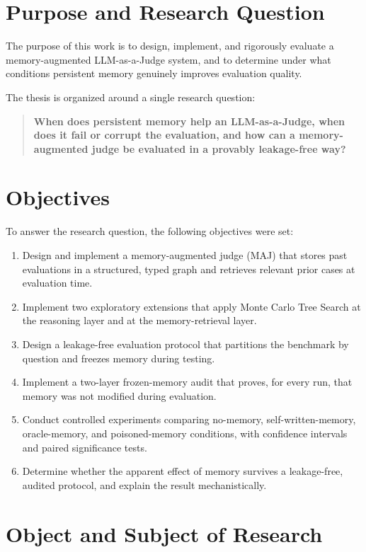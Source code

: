 \documentclass[14pt,a4paper]{extreport}
\begin{document}
\section{Purpose and Research Question}

The purpose of this work is to design, implement, and rigorously evaluate a memory-augmented LLM-as-a-Judge system, and to determine under what conditions persistent memory genuinely improves evaluation quality.

The thesis is organized around a single research question:

\begin{quote}
\textbf{When does persistent memory help an LLM-as-a-Judge, when does it fail or corrupt the evaluation, and how can a memory-augmented judge be evaluated in a provably leakage-free way?}
\end{quote}

\section{Objectives}

To answer the research question, the following objectives were set:

\begin{enumerate}
    \item Design and implement a memory-augmented judge (MAJ) that stores past evaluations in a structured, typed graph and retrieves relevant prior cases at evaluation time.
    \item Implement two exploratory extensions that apply Monte Carlo Tree Search at the reasoning layer and at the memory-retrieval layer.
    \item Design a leakage-free evaluation protocol that partitions the benchmark by question and freezes memory during testing.
    \item Implement a two-layer frozen-memory audit that proves, for every run, that memory was not modified during evaluation.
    \item Conduct controlled experiments comparing no-memory, self-written-memory, oracle-memory, and poisoned-memory conditions, with confidence intervals and paired significance tests.
    \item Determine whether the apparent effect of memory survives a leakage-free, audited protocol, and explain the result mechanistically.
\end{enumerate}

\section{Object and Subject of Research}
\end{document}
